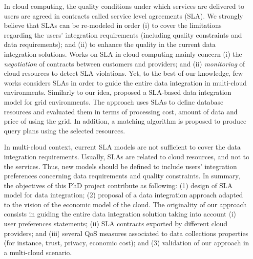 In cloud computing, the quality conditions under which services are delivered to users are agreed in contracts called service level agreements (SLA). We strongly believe that SLAs can be re-modeled in order (i) to cover the limitations regarding the users' integration requirements (including quality constraints and data requirements); and (ii) to enhance the quality in the current data integration solutions. 
%
Works on SLA in cloud computing mainly concern (i) the \textit{negotiation} of contracts between customers and providers; and (ii) \textit{monitoring} of cloud resources to detect SLA violations.
Yet, to the best of our knowledge, few works considers SLAs in order to guide the entire data integration in multi-cloud environments.
Similarly to our idea, \cite{Nie07} proposed a SLA-based data integration model for grid environments. The approach uses SLAs to define database resources and evaluated them in terms of processing cost, amount of data and price of using the grid. In addition, a matching algorithm is proposed to produce query plans using the selected resources. 


In multi-cloud context, current SLA models are not sufficient to cover the data integration requirements. Usually, SLAs are related to cloud resources, and not to the services. Thus, new models should be defined to include users' integration preferences concerning data requirements and quality constraints. In summary, the objectives of this PhD project contribute as following: (1) design of SLA model for data integration; (2) proposal of a data integration approach adapted to the vision of the economic model of the cloud. The originality of our approach consists in guiding the entire data integration solution taking into account (i) user preferences statements; (ii) SLA contracts exported by different cloud providers; and (iii) several QoS measures associated to data collections properties (for instance, trust, privacy, economic cost); and (3) validation of our approach in a multi-cloud scenario.
